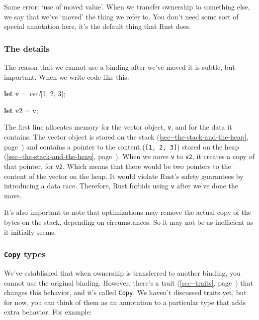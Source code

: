 \documentclass[a4paper,]{book}
\renewcommand*{\hyperref}[2][\ar]{%
  \def\ar{#2}%
  #2 (\autoref{#1}, page~\pageref{#1})}
\newenvironment{Shaded}{\begin{snugshade}}{\end{snugshade}}
\newcommand{\KeywordTok}[1]{\textcolor[rgb]{0.13,0.29,0.53}{\textbf{{#1}}}}
\newcommand{\DecValTok}[1]{\textcolor[rgb]{0.00,0.00,0.81}{{#1}}}
\newcommand{\PreprocessorTok}[1]{\textcolor[rgb]{0.56,0.35,0.01}{\textit{{#1}}}}
\newcommand{\NormalTok}[1]{{#1}}
\begin{document}
Same error: `use of moved value'. When we transfer ownership to
something else, we say that we've `moved' the thing we refer to. You
don't need some sort of special annotation here, it's the default thing
that Rust does.

\subsubsection{The details}\label{the-details}

The reason that we cannot use a binding after we've moved it is subtle,
but important. When we write code like this:

\begin{Shaded}
\begin{Highlighting}[]
\KeywordTok{let} \NormalTok{v = }\PreprocessorTok{vec!}\NormalTok{[}\DecValTok{1}\NormalTok{, }\DecValTok{2}\NormalTok{, }\DecValTok{3}\NormalTok{];}

\KeywordTok{let} \NormalTok{v2 = v;}
\end{Highlighting}
\end{Shaded}

The first line allocates memory for the vector object, \texttt{v}, and
for the data it contains. The vector object is stored on the
\hyperref[sec--the-stack-and-the-heap]{stack} and contains a pointer to
the content (\texttt{{[}1,\ 2,\ 3{]}}) stored on the
\hyperref[sec--the-stack-and-the-heap]{heap}. When we move \texttt{v} to
\texttt{v2}, it creates a copy of that pointer, for \texttt{v2}. Which
means that there would be two pointers to the content of the vector on
the heap. It would violate Rust's safety guarantees by introducing a
data race. Therefore, Rust forbids using \texttt{v} after we've done the
move.

It's also important to note that optimizations may remove the actual
copy of the bytes on the stack, depending on circumstances. So it may
not be as inefficient as it initially seems.

\subsubsection{\texorpdfstring{\texttt{Copy}
types}{Copy types}}\label{copy-types}

We've established that when ownership is transferred to another binding,
you cannot use the original binding. However, there's a
\hyperref[sec--traits]{trait} that changes this behavior, and it's
called \texttt{Copy}. We haven't discussed traits yet, but for now, you
can think of them as an annotation to a particular type that adds extra
behavior. For example:
\end{document}
